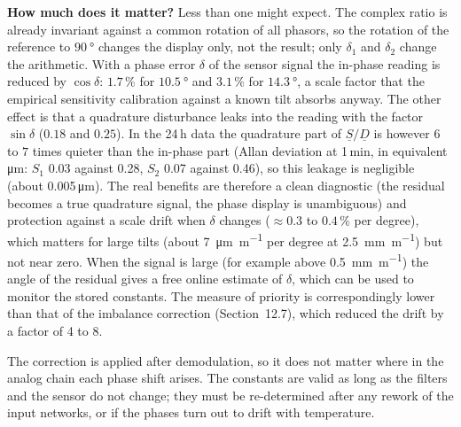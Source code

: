 \documentclass[11pt,a4paper]{article}
\begin{document}
\textbf{How much does it matter?}  Less than one might expect.  The complex
ratio is already invariant against a common rotation of all phasors, so the
rotation of the reference to $\SI{90}{\degree}$ changes the display only, not
the result; only $\delta_1$ and $\delta_2$ change the arithmetic.  With a
phase error $\delta$ of the sensor signal the in-phase reading is reduced by
$\cos\delta$: $1.7\,\%$ for $\SI{10.5}{\degree}$ and $3.1\,\%$ for
$\SI{14.3}{\degree}$, a scale factor that the empirical sensitivity
calibration against a known tilt absorbs anyway.  The other effect is that a
quadrature disturbance leaks into the reading with the factor $\sin\delta$
($0.18$ and $0.25$).  In the 24\,h data the quadrature part of
$\underline{S}/\underline{D}$ is however $6$ to $7$ times quieter than the
in-phase part (Allan deviation at 1\,min, in equivalent
\si{\micro\metre}: $S_1$ 0.03 against 0.28, $S_2$ 0.07 against 0.46), so
this leakage is negligible (about 0.005\,\si{\micro\metre}).  The real
benefits are therefore a clean diagnostic (the residual becomes a true
quadrature signal, the phase display is unambiguous) and protection against
a scale drift when $\delta$ changes ($\approx0.3$ to $0.4\,\%$ per degree),
which matters for large tilts (about \SI{7}{\micro\metre\per\metre} per
degree at \SI{2.5}{\milli\metre\per\metre}) but not near zero.  When the
signal is large (for example above \SI{0.5}{\milli\metre\per\metre}) the
angle of the residual gives a free online estimate of $\delta$, which can be
used to monitor the stored constants.  The measure of priority is
correspondingly lower than that of the imbalance correction (Section~12.7),
which reduced the drift by a factor of 4 to 8.

The correction is applied after demodulation, so it does not matter where
in the analog chain each phase shift arises.  The constants are valid as long
as the filters and the sensor do not change; they must be re-determined
after any rework of the input networks, or if the phases turn out to drift
with temperature.
\end{document}
